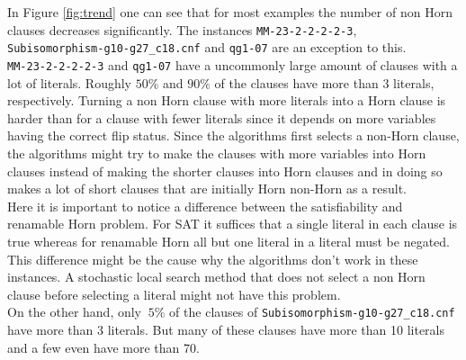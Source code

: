 \documentclass[12pt,a4paper]{article}
\begin{document}
In Figure \ref{fig:trend} one can see that for most examples the number of non Horn clauses decreases significantly. The instances \texttt{MM-23-2-2-2-2-3},\\ \texttt{Subisomorphism-g10-g27\_c18.cnf} and \texttt{qg1-07} are an exception to this.\\

\texttt{MM-23-2-2-2-2-3} and \texttt{qg1-07} have a uncommonly large amount of clauses with a lot of literals. Roughly $50\%$ and $90\%$ of the clauses have more than 3 literals, respectively. Turning a non Horn clause with more literals into a Horn clause is harder than for a clause with fewer literals since it depends on more variables having the correct flip status. Since the algorithms first selects a non-Horn clause, the algorithms might try to make the clauses with more variables into Horn clauses instead of making the shorter clauses into Horn clauses and in doing so makes a lot of short clauses that are initially Horn non-Horn as a result. \\
Here it is important to notice a difference between the satisfiability and renamable Horn problem. For SAT it suffices that a single literal in each clause is true whereas for renamable Horn all but one literal in a literal must be negated. This difference might be the cause why the algorithms don't work in these instances. A stochastic local search method that does not select a non Horn clause before selecting a literal might not have this problem.\\
On the other hand, only $~5\%$ of the clauses of \texttt{Subisomorphism-g10-g27\_c18.cnf} have more than 3  literals. But many of these clauses have more than 10 literals and a few even have more than 70.\\
\end{document}
